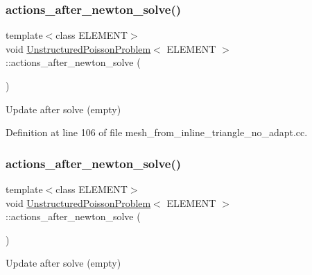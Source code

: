 \subsubsection{\texorpdfstring{actions\+\_\+after\+\_\+newton\+\_\+solve()}{actions\_after\_newton\_solve()}\hspace{0.1cm}{\footnotesize\ttfamily [1/2]}}
{\footnotesize\ttfamily template$<$class E\+L\+E\+M\+E\+NT$>$ \\
void \hyperlink{classUnstructuredPoissonProblem}{Unstructured\+Poisson\+Problem}$<$ E\+L\+E\+M\+E\+NT $>$\+::actions\+\_\+after\+\_\+newton\+\_\+solve (\begin{DoxyParamCaption}{ }\end{DoxyParamCaption})\hspace{0.3cm}{\ttfamily [inline]}}



Update after solve (empty) 



Definition at line 106 of file mesh\+\_\+from\+\_\+inline\+\_\+triangle\+\_\+no\+\_\+adapt.\+cc.

\mbox{\label{classUnstructuredPoissonProblem_a822bd18e50ebeefd6d1c196fad7c0bf1}} 
\subsubsection{\texorpdfstring{actions\+\_\+after\+\_\+newton\+\_\+solve()}{actions\_after\_newton\_solve()}\hspace{0.1cm}{\footnotesize\ttfamily [2/2]}}
{\footnotesize\ttfamily template$<$class E\+L\+E\+M\+E\+NT$>$ \\
void \hyperlink{classUnstructuredPoissonProblem}{Unstructured\+Poisson\+Problem}$<$ E\+L\+E\+M\+E\+NT $>$\+::actions\+\_\+after\+\_\+newton\+\_\+solve (\begin{DoxyParamCaption}{ }\end{DoxyParamCaption})\hspace{0.3cm}{\ttfamily [inline]}}



Update after solve (empty) 



